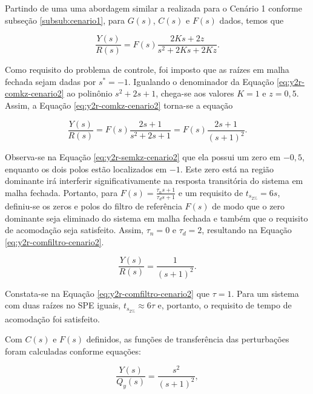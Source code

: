 Partindo de uma uma abordagem similar a realizada para o Cenário 1 conforme
subseção \ref{subsub:cenario1}, para $G(s)$, $C(s)$ e $F(s)$ dados, temos que

\begin{equation}
    \label{eq:y2r-comkz-cenario2}
    \frac{Y(s)}{R(s)} = F(s)\frac{2Ks + 2z}{s^2 + 2Ks + 2Kz}.
\end{equation}

Como requisito do problema de controle, foi imposto que as raízes em malha
fechada sejam dadas por $s^* = -1$. Igualando o denominador da Equação
\ref{eq:y2r-comkz-cenario2} ao polinônio $s^2 + 2s + 1$, chega-se aos valores
$K = 1$ e $z = 0,5$. Assim, a Equação \ref{eq:y2r-comkz-cenario2} torna-se 
a equação

\begin{equation}
    \label{eq:y2r-semkz-cenario2}
    \frac{Y(s)}{R(s)} = F(s)\frac{2s + 1}{s^2 + 2s + 1}
    = F(s)\frac{2s + 1}{(s+1)^2}.
\end{equation}

Observa-se na Equação \ref{eq:y2r-semkz-cenario2} que ela possui um zero em
$-0,5$, enquanto os dois polos estão localizados em $-1$. Este zero está na
região dominante irá interferir significativamente na resposta transitória do
sistema em malha fechada. Portanto, para $F(s) = \frac{\tau_{n}s + 1}{\tau_{d}s
+ 1}$ e um requisito de $t_{s_{2\%}} = 6s$, definiu-se os zeros e polos do
filtro de referência $F(s)$ de modo que o zero dominante seja eliminado do
sistema em malha fechada e também que o requisito de acomodação seja satisfeito.
Assim, $\tau_{n} = 0$ e $\tau_{d} = 2$, resultando na Equação
\ref{eq:y2r-comfiltro-cenario2}.

\begin{equation}
    \label{eq:y2r-comfiltro-cenario2}
    \frac{Y(s)}{R(s)} = \frac{1}{(s+1)^2}.
\end{equation}

Constata-se na Equação \ref{eq:y2r-comfiltro-cenario2} que $\tau = 1$. Para um
sistema com duas raízes no SPE iguais, $t_{s_{2\%}} \approx 6\tau$ e, portanto,
o requisito de tempo de acomodação foi satisfeito.

Com $C(s)$ e $F(s)$ definidos, as funções de transferência das perturbações foram
calculadas conforme equações:

\begin{equation}
    \label{eq:y2qy-cenario2}
    \frac{Y(s)}{Q_{y}(s)} = \frac{s^2}{(s + 1)^2},
\end{equation}

